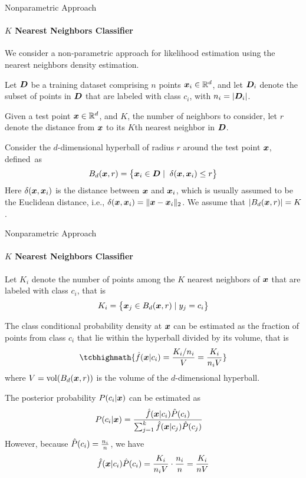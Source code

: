 \begin{frame}{Nonparametric Approach}
\framesubtitle{$K$ Nearest Neighbors Classif\/{i}er}

We consider a
non-parametric approach for likelihood estimation 
using the nearest neighbors density estimation.

\medskip
Let ${\boldsymbol D}$ be a training dataset comprising $n$ points ${\boldsymbol x}_i \in
{\mathord{\mathbb R}}^d$, and let ${\boldsymbol D}_i$ denote the subset of points in ${\boldsymbol D}$ that are
labeled with class $c_i$, with $n_i = |{\boldsymbol D}_i|$.  

\medskip
Given a test point ${\boldsymbol x}
\in {\mathord{\mathbb R}}^d$, and $K$, the number of neighbors to consider, let $r$
denote the distance from ${\boldsymbol x}$ to its $K$th nearest neighbor in ${\boldsymbol D}$.

\medskip
Consider the $d$-dimensional hyperball of radius $r$ around the test
point ${\boldsymbol x}$, def\/{i}ned~as
\begin{align*}
  B_d({\boldsymbol x},r) = \bigl\{{\boldsymbol x}_i \in {\boldsymbol D} \mid
  \;\delta({\boldsymbol x},{\boldsymbol x}_i) \leq r\bigr\}
\end{align*}
Here $\delta({\boldsymbol x}, {\boldsymbol x}_i)$ is the distance between ${\boldsymbol x}$ and ${\boldsymbol x}_i$,
which is usually assumed to be the Euclidean distance, i.e., $\delta({\boldsymbol x},
{\boldsymbol x}_i) = \|{\boldsymbol x} - {\boldsymbol x}_i \|_2$.  We assume that $|B_d({\boldsymbol x},r)| = K$.
\end{frame}


\begin{frame}{Nonparametric Approach}
\framesubtitle{$K$ Nearest Neighbors Classif\/{i}er}
Let $K_i$ denote the number of points among the $K$ nearest neighbors of
${\boldsymbol x}$ that are labeled with class $c_i$, that is
\begin{align*}
  K_i = \bigl\{{\boldsymbol x}_{j} \in B_d({\boldsymbol x},r) \mid y_{j} = c_i\bigr\}
\end{align*}

The class conditional probability density at ${\boldsymbol x}$ can be estimated as
the fraction of points from class $c_i$ that lie within the hyperball
divided by its volume, that is
\begin{align*}
\tcbhighmath{
  \hf(\bx|c_i) = \frac{K_i\text{/}n_i}{V}  = \frac{K_i}{n_i V}
}
\end{align*}
where $V = \vol(B_d(\bx,r))$ is the volume of the $d$-dimensional
hyperball.

The posterior probability $P(c_i|{\boldsymbol x})$
can be estimated as
\begin{align*}
    P(c_i|{\boldsymbol x}) &
    = \frac{\kern3pt\hat{\kern-3pt f}({\boldsymbol x}|c_i) \hat{P}(c_i)}{\sum_{j=1}^k \kern3pt\hat{\kern-3pt f}({\boldsymbol x}|c_{j}) \hat{P}(c_{j})}
\end{align*}
However, because $\hat{P}(c_i) = \tfrac{n_i}{n}$, we have
\begin{align*}
  \kern3pt\hat{\kern-3pt f}({\boldsymbol x}|c_i) \hat{P}(c_i) = \frac{K_i}{n_i V} \cdot \frac{n_i}{n} =
  \frac{K_i}{nV}
\end{align*}
\end{frame}


